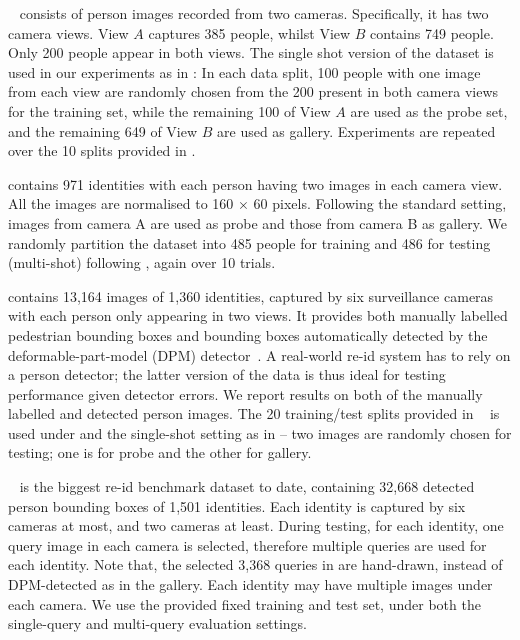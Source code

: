 \documentclass[10pt,twocolumn,letterpaper]{article}
\begin{document}
~\cite{hirzer2011person} consists of person images recorded from two cameras. 
Specifically,  it has two camera views.  View $A$ captures  385 people, whilst View $B$ contains 749 people. Only 200 people appear in both views. The single shot version of the dataset is used in our experiments as in \cite{hirzer2012relaxed}: In each data split, 100 people with one image from each view are randomly chosen from the 200 present in both camera views for the training set, while the remaining 100 of View $A$ are used as the probe set, and the remaining 649 of View $B$ are used as gallery. Experiments are repeated over the 10 splits provided in \cite{hirzer2012relaxed}.



 \cite{CUHK_dataset}  
contains 971 identities with each person having two images in each camera view. All the images are normalised to 160 $\times$ 60 pixels. Following the standard setting, images from camera A are used as probe and those from camera B as gallery. We randomly partition the dataset into 485 people for training and 486 for testing (multi-shot) following \cite{liao2015person, zhao2014learning}, again over 10 trials.

 \cite{li2014deepreid}  contains 13,164 images of 1,360 identities, captured by six surveillance cameras with each person only appearing in two views. It provides both manually labelled pedestrian bounding boxes and bounding boxes automatically detected by the deformable-part-model (DPM) detector~\cite{felzenszwalb2010object}. 
A real-world re-id system has to rely on a person detector; the latter version of the data is thus ideal for testing performance given detector errors.  
We report results on both of the manually labelled and detected  person images. The 20 training/test splits provided  in ~\cite{li2014deepreid} is used under and the single-shot setting as in \cite{liao2015person} -- two images are randomly chosen for testing; one is for probe and the other for gallery.


~\cite{zheng2015scalable} is the biggest re-id benchmark dataset to date, containing 32,668 detected person bounding boxes of 1,501 identities. Each identity is captured by six cameras at most, and two cameras at least. During testing, for each identity, one query image in each camera is  selected, therefore multiple queries are used for each identity. Note that, the selected 3,368 queries in \cite{zheng2015scalable} are hand-drawn, instead of DPM-detected as in the gallery. Each identity may have multiple images under each camera. 
We use the provided fixed training and test set, under both the single-query and multi-query evaluation settings. 
\end{document}
